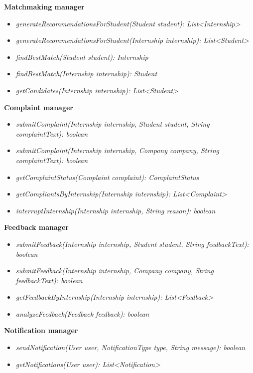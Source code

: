 \textbf{Matchmaking manager}
\begin{itemize}
    \item \textit{generateRecommendationsForStudent(Student student): List<Internship>}
    \item \textit{generateRecommendationsForStudent(Internship internship): List<Student>}
    \item \textit{findBestMatch(Student student): Internship}
    \item \textit{findBestMatch(Internship internship): Student}
    \item \textit{getCandidates(Internship internship): List<Student>}
\end{itemize}
\textbf{Complaint manager}
\begin{itemize}
    \item \textit{submitComplaint(Internship internship, Student student, String complaintText): boolean}
    \item \textit{submitComplaint(Internship internship, Company company, String complaintText): boolean}
    \item \textit{getComplaintStatus(Complaint complaint): ComplaintStatus}
    \item \textit{getCompliantsByInternship(Internship internship): List<Complaint>}
    \item \textit{interruptInternship(Internship internship, String reason): boolean}
\end{itemize}
\textbf{Feedback manager}
\begin{itemize}
    \item \textit{submitFeedback(Internship internship, Student student, String feedbackText): boolean}
    \item \textit{submitFeedback(Internship internship, Company company, String feedbackText): boolean}
    \item \textit{getFeedbackByInternship(Internship internship): List<Feedback>}
    \item \textit{analyzeFeedback(Feedback feedback): boolean}
\end{itemize}
\textbf{Notification manager}
\begin{itemize}
    \item \textit{sendNotification(User user, NotificationType type, String message): boolean}
    \item \textit{getNotifications(User user): List<Notification>}
\end{itemize}


